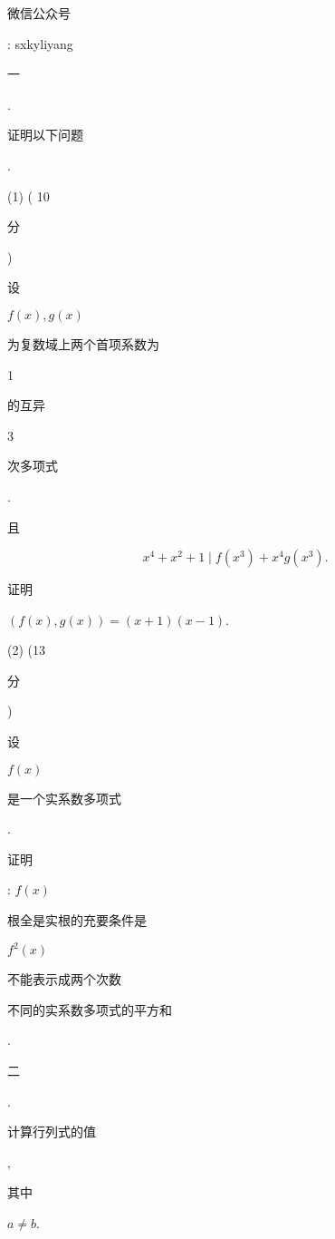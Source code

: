 \documentclass[10pt]{article}
\begin{document}
\begin{CJK}{UTF8}{mj}微信公众号\end{CJK}: sxkyliyang

\begin{CJK}{UTF8}{mj}一\end{CJK}. \begin{CJK}{UTF8}{mj}证明以下问题\end{CJK}.

(1) ( 10 \begin{CJK}{UTF8}{mj}分\end{CJK}) \begin{CJK}{UTF8}{mj}设\end{CJK} $f(x), g(x)$ \begin{CJK}{UTF8}{mj}为复数域上两个首项系数为\end{CJK} 1 \begin{CJK}{UTF8}{mj}的互异\end{CJK} 3 \begin{CJK}{UTF8}{mj}次多项式\end{CJK}. \begin{CJK}{UTF8}{mj}且\end{CJK}
$$
x^{4}+x^{2}+1 \mid f\left(x^{3}\right)+x^{4} g\left(x^{3}\right) .
$$
\begin{CJK}{UTF8}{mj}证明\end{CJK} $(f(x), g(x))=(x+1)(x-1)$.

(2) (13 \begin{CJK}{UTF8}{mj}分\end{CJK}) \begin{CJK}{UTF8}{mj}设\end{CJK} $f(x)$ \begin{CJK}{UTF8}{mj}是一个实系数多项式\end{CJK}. \begin{CJK}{UTF8}{mj}证明\end{CJK}: $f(x)$ \begin{CJK}{UTF8}{mj}根全是实根的充要条件是\end{CJK} $f^{2}(x)$ \begin{CJK}{UTF8}{mj}不能表示成两个次数\end{CJK} \begin{CJK}{UTF8}{mj}不同的实系数多项式的平方和\end{CJK}.

\begin{CJK}{UTF8}{mj}二\end{CJK}. \begin{CJK}{UTF8}{mj}计算行列式的值\end{CJK}, \begin{CJK}{UTF8}{mj}其中\end{CJK} $a \neq b$.
\end{document}
